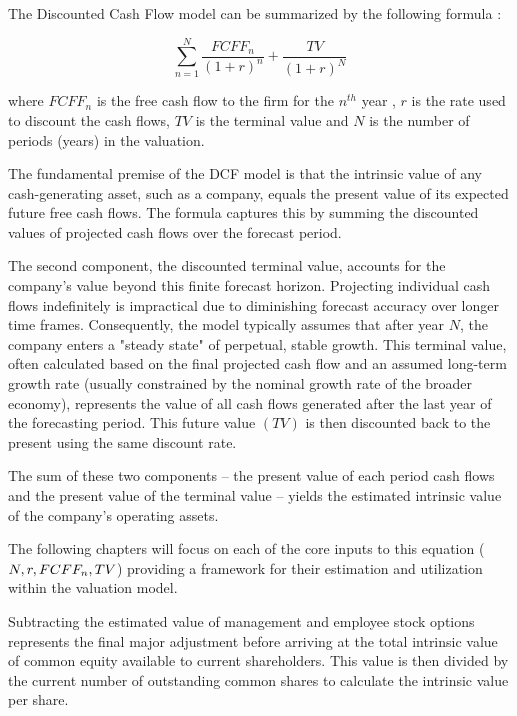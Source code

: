 The Discounted Cash Flow model can be summarized by the following formula \parencite{brealey2020principles}:

\begin{equation} \label{eq:dcf_formula}
    \sum_{n=1}^{N}\frac{FCFF_n}{(1+r)^n} + {\frac{TV}{(1+r)^N}}
\end{equation}

where \(FCFF_n\) is the free cash flow to the firm for the \(n^{th}\) year , \(r\) is the rate used to discount the cash flows, \(TV\) is the terminal value and \(N\) is the number of periods (years) in the valuation.

The fundamental premise of the DCF model is that the intrinsic value of any cash-generating asset, such as a company, equals the present value of its expected future free cash flows. The formula captures this by summing the discounted values of projected cash flows over the forecast period.

The second component, the discounted terminal value, accounts for the company's value beyond this finite forecast horizon. Projecting individual cash flows indefinitely is impractical due to diminishing forecast accuracy over longer time frames. Consequently, the model typically assumes that after year \(N\), the company enters a "steady state" of perpetual, stable growth. This terminal value, often calculated based on the final projected cash flow and an assumed long-term growth rate (usually constrained by the nominal growth rate of the broader economy), represents the value of all cash flows generated after the last year of the forecasting period. This future value \((TV)\) is then discounted back to the present using the same discount rate.

The sum of these two components – the present value of each period cash flows and the present value of the terminal value – yields the estimated intrinsic value of the company's operating assets.

The following chapters will focus on each of the core inputs to this equation (\(N,\space r, \space FCFF_n,\space TV\)) providing a framework for their estimation and utilization within the valuation model.











Subtracting the estimated value of management and employee stock options represents the final major adjustment before arriving at the total intrinsic value of common equity available to current shareholders. This value is then divided by the current number of outstanding common shares to calculate the intrinsic value per share.